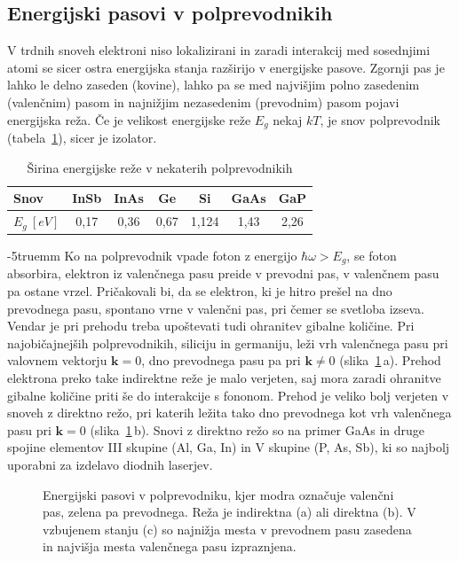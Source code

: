 \subsection*{Energijski pasovi v polprevodnikih}
V trdnih snoveh elektroni niso lokalizirani in zaradi interakcij med sosednjimi atomi
se sicer ostra energijska stanja razširijo v energijske pasove. Zgornji pas je lahko 
le delno zaseden (kovine), lahko pa se med najvišjim polno zasedenim 
(valenčnim) pasom in najnižjim nezasedenim (prevodnim) pasom pojavi energijska reža. 
Če je velikost energijske reže $E_g$ nekaj $kT$, je snov polprevodnik 
(tabela~\ref{table:gap}), sicer je izolator.
\begin{table}[h]
 \centering
\begin{tabular}{|l|c|c|c|c|c|c|} \hline  
      Snov & InSb & InAs & Ge & Si & GaAs & GaP \\ \hline
      $E_g~[\si{eV}]$ & 0,17 & 0,36 & 0,67 & 1,124 & 1,43 & 2,26  \\ \hline  
\end{tabular}
  \caption{Širina energijske reže v nekaterih polprevodnikih}
\label{table:gap}
\end{table}
\vglue-5truemm
Ko na polprevodnik vpade foton z energijo $\hbar\omega > E_g$, se foton absorbira, elektron
iz valenčnega pasu preide v prevodni pas, v valenčnem pasu pa ostane vrzel. Pričakovali bi, 
da se elektron, ki je hitro prešel na dno prevodnega pasu, spontano vrne v valenčni 
pas, pri čemer se svetloba izseva. Vendar je pri 
prehodu treba upoštevati tudi ohranitev gibalne količine. Pri najobičajnejših polprevodnikih, 
siliciju in germaniju, leži vrh valenčnega pasu pri valovnem vektorju $\mathbf{k}=0$, 
dno prevodnega pasu pa pri $\mathbf{k} \neq 0$ (slika~\ref{fig:Ek}\,a).
Prehod elektrona preko take indirektne reže je malo verjeten, saj mora zaradi ohranitve 
gibalne količine priti še do interakcije s fononom. Prehod je veliko bolj verjeten v 
snoveh z direktno režo, pri katerih ležita tako dno prevodnega kot vrh valenčnega pasu 
pri $\mathbf{k}=0$ (slika~\ref{fig:Ek}\,b). Snovi z direktno režo so na primer GaAs in 
druge spojine elementov III skupine (Al, Ga, In) in V skupine (P, As, Sb), ki so najbolj 
uporabni za izdelavo diodnih laserjev.
\begin{figure}[h]
\centering
\def\svgwidth{145truemm} 

\caption{Energijski pasovi v polprevodniku, kjer modra označuje valenčni pas, 
zelena pa prevodnega. Reža je indirektna (a) ali direktna (b). V vzbujenem stanju (c) so 
najnižja mesta v prevodnem pasu zasedena in najvišja mesta valenčnega pasu
izpraznjena. 
}
\label{fig:Ek}
\end{figure}

